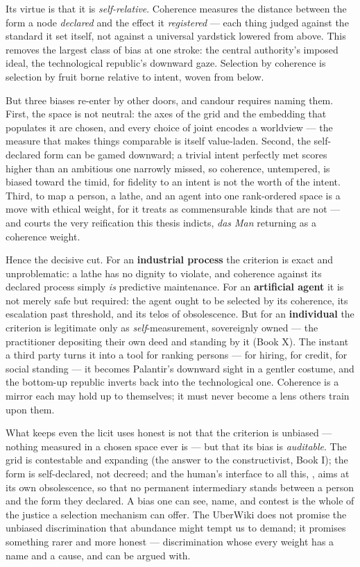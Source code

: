 Its virtue is that it is \emph{self-relative}. Coherence measures the distance
between the form a node \emph{declared} and the effect it \emph{registered} ---
each thing judged against the standard it set itself, not against a universal
yardstick lowered from above. This removes the largest class of bias at one
stroke: the central authority's imposed ideal, the technological republic's
downward gaze. Selection by coherence is selection by fruit borne relative to
intent, woven from below.

But three biases re-enter by other doors, and candour requires naming them. First,
the space is not neutral: the axes of the grid and the embedding that populates it
are chosen, and every choice of joint encodes a worldview --- the measure that
makes things comparable is itself value-laden. Second, the self-declared form can
be gamed downward; a trivial intent perfectly met scores higher than an ambitious
one narrowly missed, so coherence, untempered, is biased toward the timid, for
fidelity to an intent is not the worth of the intent. Third, to map a person, a
lathe, and an agent into one rank-ordered space is a move with ethical weight, for
it treats as commensurable kinds that are not --- and courts the very reification
this thesis indicts, \emph{das Man} returning as a coherence weight.

Hence the decisive cut. For an \textbf{industrial process} the criterion is exact
and unproblematic: a lathe has no dignity to violate, and coherence against its
declared process simply \emph{is} predictive maintenance. For an \textbf{artificial
agent} it is not merely safe but required: the agent ought to be selected by its
coherence, its escalation past threshold, and its telos of obsolescence. But for an
\textbf{individual} the criterion is legitimate only as \emph{self}-measurement,
sovereignly owned --- the practitioner depositing their own deed and standing by it
(Book X). The instant a third party turns it into a tool for ranking persons ---
for hiring, for credit, for social standing --- it becomes Palantir's downward
sight in a gentler costume, and the bottom-up republic inverts back into the
technological one. Coherence is a mirror each may hold up to themselves; it must
never become a lens others train upon them.

What keeps even the licit uses honest is not that the criterion is unbiased ---
nothing measured in a chosen space ever is --- but that its bias is
\emph{auditable}. The grid is contestable and expanding (the answer to the
constructivist, Book I); the form is self-declared, not decreed; and the human's
interface to all this, , aims at its own obsolescence, so that no
permanent intermediary stands between a person and the form they declared. A bias
one can see, name, and contest
is the whole of the justice a selection mechanism can offer. The UberWiki does not
promise the unbiased discrimination that abundance might tempt us to demand; it
promises something rarer and more honest --- discrimination whose every weight has
a name and a cause, and can be argued with.

